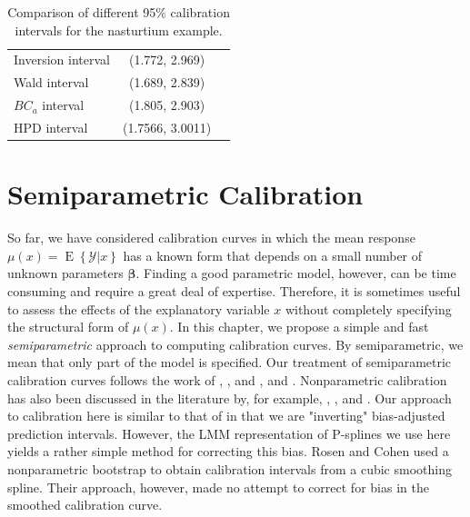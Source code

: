\documentclass[cmfont,usenames,dvipsnames,leqno]{afit-etd}\usepackage[]{graphicx}\usepackage[]{color}
\newcommand{\mc}[1]{\ensuremath{\mathcal{#1}}}
\newcommand{\E}{\operatorname{E}}
\begin{document}
\begin{table}
  \begin{center}
     \begin{tabular}{lcc}
       \toprule
       Inversion interval & (1.772, 2.969) \\ 
       Wald interval      & (1.689, 2.839) \\ 
       $BC_a$ interval    & (1.805, 2.903) \\ 
       HPD interval       & (1.7566, 3.0011) \\ 
       \bottomrule
     \end{tabular}
   \end{center}
   \caption[ 95\% calibration intervals for the nasturtium data]{Comparison of different 95\% calibration intervals for the nasturtium example. \label{tab:results}}
 \end{table}





\chapter{Semiparametric Calibration}
\label{chap:nonparametric}
So far, we have considered calibration curves in which the mean response $\mu(x) = \E\left\{\mc{Y} | x\right\}$ has a known form that depends on a small number of unknown parameters $\bm{\beta}$. Finding a good parametric model, however, can be time consuming and require a great deal of expertise. Therefore, it is sometimes useful to assess the effects of the explanatory variable $x$ without completely specifying the structural form of $\mu(x)$. In this chapter, we propose a simple and fast \textit{semiparametric} approach to computing calibration curves. By semiparametric, we mean that only part of the model is specified. Our treatment of semiparametric calibration curves follows the work of \citet{brumback_comment_1999}, \citet{ruppert_selecting_2002}, and \citet{ruppert_semiparametric_2003}, and \citet{crainiceanu_bayesian_2005}. Nonparametric calibration has also been discussed in the literature by, for example, \citet{clark_calibration_1979}, \citet{clark_calibration_1980}, and \citet{rosen_constructing_1995}. Our approach to calibration here is similar to that of \citet{clark_calibration_1980} in that we are "inverting" bias-adjusted prediction intervals. However, the \ac{LMM} representation of \ac{P-spline}s \citep{ruppert_semiparametric_2003} we use here yields a rather simple method for correcting this bias. Rosen and Cohen used a nonparametric bootstrap to obtain calibration intervals from a cubic smoothing spline. Their approach, however, made no attempt to correct for bias in the smoothed calibration curve.
\end{document}
